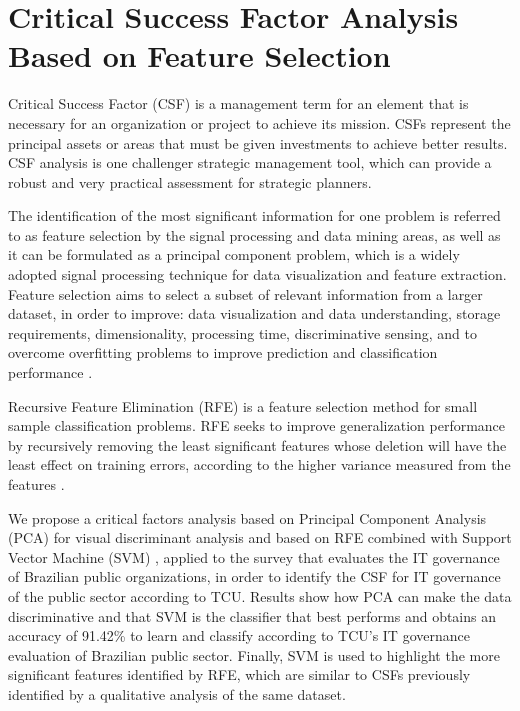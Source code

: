 \chapter{Critical Success Factor Analysis Based on Feature Selection}
\label{apx:b_csf_fs}


Critical Success Factor (CSF) is a management term for an element that is necessary for an organization or project to achieve its mission. CSFs represent the principal assets or areas that must be given investments to achieve better results. CSF analysis is one challenger strategic management tool, which can provide a robust and very practical assessment for strategic planners.

The identification of the most significant information for one problem is referred to as feature selection by the signal processing and data mining areas, as well as it can be formulated as a principal component problem, which is a widely adopted signal processing technique for data visualization and feature extraction. Feature selection aims to select a subset of relevant information from a larger dataset, in order to improve: data visualization and data understanding, storage requirements, dimensionality, processing time, discriminative sensing, and to overcome overfitting problems to improve prediction and classification performance \cite{chandrashekar2014survey}.

Recursive Feature Elimination (RFE) is a feature selection method for small sample classification problems. RFE seeks to improve generalization performance by recursively removing the least significant features whose deletion will have the least effect on training errors, according to the higher variance measured from the features \cite{chen2007enhanced}.

We propose a critical factors analysis based on Principal Component Analysis (PCA) for visual discriminant analysis and based on RFE combined with Support Vector Machine (SVM) \cite{hearst1998support}, applied to the survey that evaluates the IT governance of Brazilian public organizations, in order to identify the CSF for IT governance of the public sector according to TCU. Results show how PCA can make the data discriminative and that SVM is the classifier that best performs and obtains an accuracy of 91.42\% to learn and classify according to TCU's IT governance evaluation of Brazilian public sector. Finally, SVM is used to highlight the more significant features identified by RFE, which are similar to CSFs previously identified by a qualitative analysis of the same dataset.

